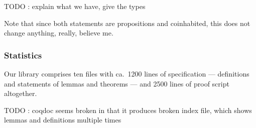 TODO : explain what we have, give the types


Note that since both statements are propositions and coinhabited, this does not change anything, really, believe me.


\subsubsection*{Statistics}

Our library comprises ten files with ca.\ 1200 lines of specification --- definitions and statements of lemmas and theorems ---
and 2500 lines of proof script altogether.


TODO : coqdoc seems broken in that it produces broken index file, which shows lemmas and definitions multiple times


%


